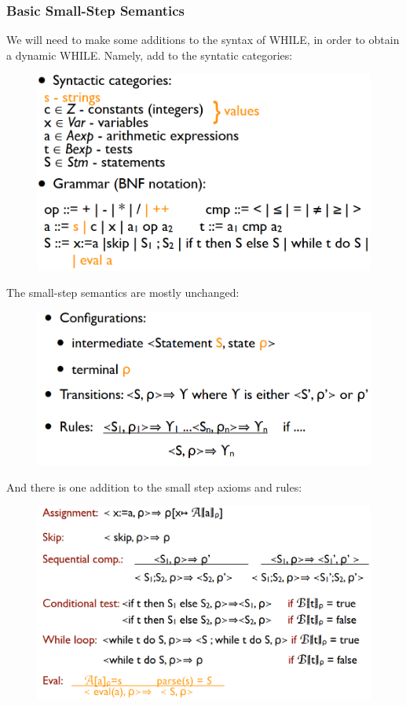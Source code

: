 \documentclass[10pt,a4paper]{report}
\begin{document}
\subsubsection{Basic Small-Step Semantics}
We will need to make some additions to the syntax of WHILE, in order to obtain a dynamic WHILE. Namely, add to the syntatic categories:
\begin{figure}[H]
\centering
\includegraphics[scale=0.4]{28.png}
\end{figure}
The small-step semantics are mostly unchanged:
\begin{figure}[H]
\centering
\includegraphics[scale=0.4]{27.png}
\end{figure}
And there is one addition to the small step axioms and rules:
\begin{figure}[H]
\centering
\includegraphics[scale=0.4]{25.png}
\end{figure}
\end{document}
